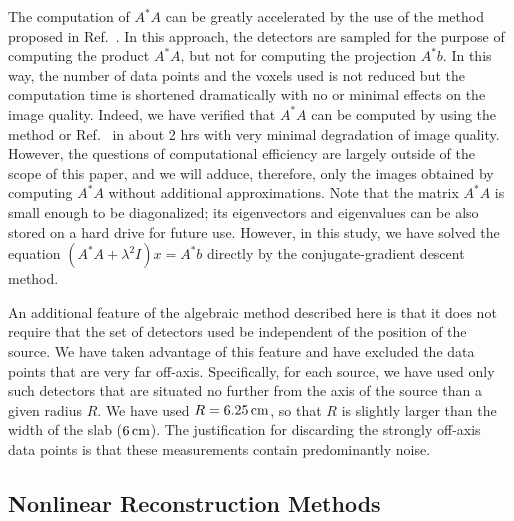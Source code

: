 The computation of $A^*A$ can be greatly accelerated by the use of the
method proposed in Ref.~\cite{markel_05_6}. In this approach, the
detectors are sampled for the purpose of computing the product $A^*A$,
but not for computing the projection $A^*b$. In this way, the number
of data points and the voxels used is not reduced but the computation
time is shortened dramatically with no or minimal effects on the image
quality. Indeed, we have verified that $A^*A$ can be computed by using
the method or Ref.~\cite{markel_05_6} in about 2 hrs with very minimal
degradation of image quality. However, the questions of computational
efficiency are largely outside of the scope of this paper, and we will
adduce, therefore, only the images obtained by computing $A^*A$
without additional approximations. Note that the matrix $A^*A$ is
small enough to be diagonalized; its eigenvectors and eigenvalues can
be also stored on a hard drive for future use. However, in this study,
we have solved the equation $(A^*A+\lambda^2I)x=A^*b$ directly by the
conjugate-gradient descent method.

An additional feature of the algebraic method described here is that it does 
not require that the set of detectors used be independent of the position of 
the source. We have taken advantage of this feature and have excluded the 
data points that are very far off-axis. Specifically, for each source, we 
have used only such detectors that are situated no further from the axis of 
the source than a given radius $R$. We have used $R=6.25\,{\rm cm}$, so 
that $R$ is slightly larger than the width of the slab ($6\,{\rm cm}$). 
The justification for discarding the strongly off-axis data points is that 
these measurements contain predominantly noise.


\subsection{Nonlinear Reconstruction Methods}
